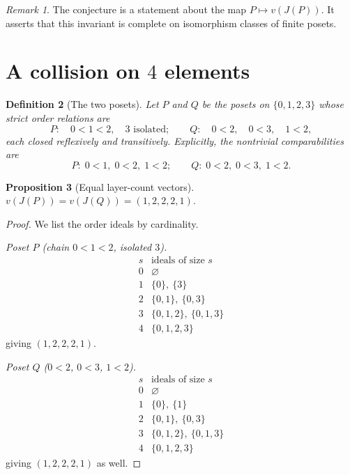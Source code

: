 \documentclass[11pt]{article}
\newtheorem{definition}{Definition}[section]
\newtheorem{proposition}[definition]{Proposition}
\theoremstyle{remark}
\newtheorem{remark}[definition]{Remark}
\begin{document}
\begin{remark}
The conjecture is a statement about the map
$P \mapsto v(J(P))$.  It asserts that this invariant is complete on isomorphism
classes of finite posets.
\end{remark}

\section{A collision on $4$ elements}
\label{sec:4}

\begin{definition}[The two posets]
Let $P$ and $Q$ be the posets on $\{0,1,2,3\}$ whose strict order relations are
\[
  P:\quad 0 < 1 < 2, \quad 3 \text{ isolated};
  \qquad
  Q:\quad 0 < 2, \quad 0 < 3, \quad 1 < 2,
\]
each closed reflexively and transitively.  Explicitly, the nontrivial
comparabilities are
\[
  P:\; 0<1,\;0<2,\;1<2;
  \qquad
  Q:\; 0<2,\;0<3,\;1<2 .
\]
\end{definition}

\begin{proposition}[Equal layer-count vectors]
\label{prop:equal4}
$v(J(P)) = v(J(Q)) = (1,2,2,2,1)$.
\end{proposition}

\begin{proof}
We list the order ideals by cardinality.

\smallskip
\noindent\emph{Poset $P$ (chain $0<1<2$, isolated $3$).}
\[
\begin{array}{c|l}
s & \text{ideals of size } s \\ \hline
0 & \varnothing \\
1 & \{0\},\ \{3\} \\
2 & \{0,1\},\ \{0,3\} \\
3 & \{0,1,2\},\ \{0,1,3\} \\
4 & \{0,1,2,3\}
\end{array}
\]
giving $(1,2,2,2,1)$.

\smallskip
\noindent\emph{Poset $Q$ ($0<2$, $0<3$, $1<2$).}
\[
\begin{array}{c|l}
s & \text{ideals of size } s \\ \hline
0 & \varnothing \\
1 & \{0\},\ \{1\} \\
2 & \{0,1\},\ \{0,3\} \\
3 & \{0,1,2\},\ \{0,1,3\} \\
4 & \{0,1,2,3\}
\end{array}
\]
giving $(1,2,2,2,1)$ as well.
\end{proof}
\end{document}
